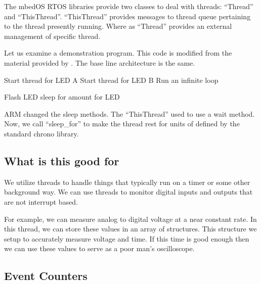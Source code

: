 \documentclass{article}
\begin{document}
The mbedOS RTOS libraries provide two classes to deal with threads: ``Thread'' and ``ThisThread''.  ``ThisThread'' provides messages to thread queue pertaining to the thread presently running.  Where as ``Thread'' provides an external management of specific thread. 

Let us examine a demonstration program.  This code is modified from the material provided by \cite{arm-based-microcontroller-mbed}.  The base line architecture is the same.  

\begin{algorithm}
	\begin{algorithmic}
		\STATE Start thread for LED A
		\STATE Start thread for LED B
		\STATE Run an infinite loop
	\end{algorithmic}
	
\end{algorithm}

\begin{algorithmic}
	\WHILE{}
		\STATE Flash LED
		\STATE sleep for amount for LED
	\ENDWHILE
	
\end{algorithmic}

ARM changed the sleep methods.  The ``ThisThread'' used to use a wait method.  Now, we call ``sleep_for'' to make the thread rest for units of defined by the standard chrono library.



 \subsection{What is this good for} %
 \label{sub:what_is_this_good_for}
 We utilize threads to handle things that typically run on a timer or some other background way.  We can use threads to monitor digital inputs and outputs that are not interrupt based.  
 
 For example, we can measure analog to digital voltage at a near constant rate.  In this thread, we can store these values in an array of structures.  This structure we setup to accurately measure voltage and time.  If this time is good enough then we can use these values to serve as a poor man's oscilloscope.  
 
 
 

\subsection{Event Counters} %
\label{sub:event_counters}
\end{document}
